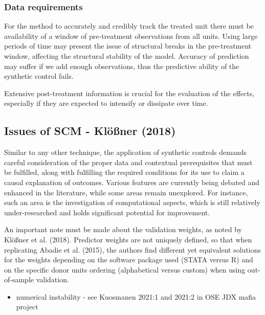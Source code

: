 \documentclass[12pt,a4paper,draft]{article}
\begin{document}
\subsubsection{Data requirements}
For the method to accurately and credibly track the treated unit there must be 
availability of a window of pre-treatment observations from all units. Using large 
periods of time may present the issue of structural breaks in the pre-treatment 
window, affecting the structural stability of the model. Accuracy of prediction 
may suffer if we add enough observations, thus the predictive ability of the 
synthetic control fails.

Extensive post-treatment information is crucial for the evaluation of the effects, 
especially if they are expected to intensify or dissipate over time.



\subsection{Issues of SCM - Klößner (2018)} %
Similar to any other technique, the application of synthetic controls demands 
careful consideration of the proper data and contextual prerequisites that must be 
fulfilled, along with fulfilling the required conditions for its use to claim a 
causal explanation of outcomes. Various features are currently being debated and 
enhanced in the literature, while some areas remain unexplored. 
For instance, such an area is the investigation of computational aspects, 
which is still relatively under-researched and holds significant potential for 
improvement.

An important note must be made about the validation weights, as noted by 
Klößner et al. (2018). Predictor weights are not uniquely defined, so that when 
replicating Abadie et al. (2015), the authors find different yet equivalent 
solutions for the weights depending on the software package used (STATA versus R) 
and on the specific donor units ordering (alphabetical versus custom) when using 
out-of-sample validation.




\begin{itemize}
    \item numerical instability -  see Kuosmanen 2021:1 and 2021:2 in OSE JDX mafia project
\end{itemize}
\end{document}
